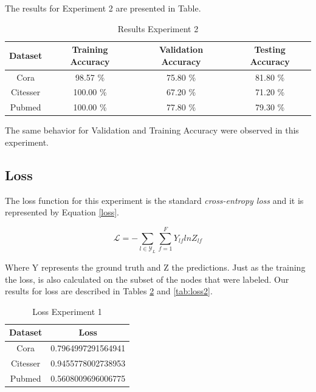 The results for Experiment 2 are presented in Table.

\begin {table}[ht]
\caption {Results Experiment 2} \label{tab:results2} 
  \begin{center}
    \begin{tabular}{|c|c|c|c|}
    \hline
    Dataset    &  Training Accuracy & Validation Accuracy & Testing Accuracy\\ \hline
    Cora          & 98.57 \% & 75.80 \%  & 81.80 \% \\ 
    Citesser      & 100.00 \%& 67.20 \%  & 71.20 \% \\
    Pubmed        & 100.00 \%& 77.80 \%  & 79.30 \% \\
    \hline
    \end{tabular}
  \end{center}
\end{table}

The same behavior for Validation and Training Accuracy were observed in this experiment.

\subsection{Loss}

The loss function for this experiment is the standard \textit{cross-entropy loss} and it is represented by Equation \ref{loss}.

\begin{equation}
  \label{loss}
  \mathcal{L} = - \sum_{l \in \mathcal{Y}_{L}} \sum_{f=1}^{F} Y_{lf}lnZ_{lf}  
\end{equation}

Where Y represents the ground truth and Z the predictions. Just as the training the loss, is also calculated on the subset of the nodes that were labeled. Our results for loss are described in Tables \ref{tab:loss1} and \ref{tab:loss2}.

\begin {table}[ht]
\caption {Loss Experiment 1} \label{tab:loss1} 
  \begin{center}
    \begin{tabular}{|c|c|}
    \hline
    Dataset    &  Loss\\ \hline
    Cora          & 0.7964997291564941 \\ 
    Citesser      & 0.9455778002738953 \\
    Pubmed        & 0.5608009696006775 \\
    \hline
    \end{tabular}
  \end{center}
\end{table}


